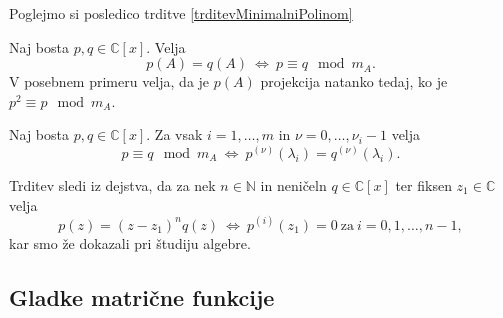 \documentclass[mat1]{fmfdelo}
\newcommand{\N}{\mathbb N}
\newcommand{\C}{\mathbb C}
\begin{document}
Poglejmo si posledico trditve \ref{trditevMinimalniPolinom}
\begin{posledica} \label{posledicaProjekcija}
    Naj bosta $p, q \in \C [x]$. Velja
    \begin{equation}
        p(A) = q(A)\  \Longleftrightarrow\ p \equiv q \mod m_A.
    \end{equation}
    V posebnem primeru velja, da je $p(A)$ projekcija natanko tedaj, ko je $p^2 \equiv p \mod m_A$.
\end{posledica}
\begin{trditev} \label{trditevPosploseniMinimalni}
    Naj bosta $p, q \in \C [x]$. Za vsak $i = 1, \ldots, m$ in $\nu = 0, \ldots, \nu_i-1$ velja
    \begin{equation}
        p \equiv q \mod m_A \ \Longleftrightarrow\  p^{(\nu)}(\lambda_i) = q^{(\nu)}(\lambda_i).
    \end{equation}
\end{trditev}
\begin{dokaz}
    Trditev sledi iz dejstva, da za nek $n\in \N$ in neničeln $q \in \C [x]$ ter fiksen $z_1 \in \C$ velja
    \begin{equation*}
        p(z) = (z-z_1)^n q(z) \ \Longleftrightarrow\  p^{(i)}(z_1)=0 \ \text{za}\  i=0, 1, \ldots, n-1,
    \end{equation*}
    kar smo že dokazali pri študiju algebre.
\end{dokaz}

\subsection{Gladke matrične funkcije}
\end{document}
